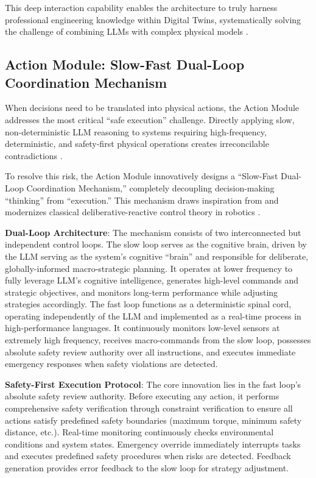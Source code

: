 This deep interaction capability enables the architecture to truly harness professional engineering knowledge within Digital Twins, systematically solving the challenge of combining LLMs with complex physical models \cite{lu2022unified}.

\subsection{Action Module: Slow-Fast Dual-Loop Coordination Mechanism}

When decisions need to be translated into physical actions, the Action Module addresses the most critical ``safe execution'' challenge. Directly applying slow, non-deterministic LLM reasoning to systems requiring high-frequency, deterministic, and safety-first physical operations creates irreconcilable contradictions \cite{amodei2016concrete}.

To resolve this risk, the Action Module innovatively designs a ``Slow-Fast Dual-Loop Coordination Mechanism,'' completely decoupling decision-making ``thinking'' from ``execution.'' This mechanism draws inspiration from and modernizes classical deliberative-reactive control theory in robotics \cite{gat1998three}.

\textbf{Dual-Loop Architecture}: The mechanism consists of two interconnected but independent control loops. The slow loop serves as the cognitive brain, driven by the LLM serving as the system's cognitive ``brain'' and responsible for deliberate, globally-informed macro-strategic planning. It operates at lower frequency to fully leverage LLM's cognitive intelligence, generates high-level commands and strategic objectives, and monitors long-term performance while adjusting strategies accordingly. The fast loop functions as a deterministic spinal cord, operating independently of the LLM and implemented as a real-time process in high-performance languages. It continuously monitors low-level sensors at extremely high frequency, receives macro-commands from the slow loop, possesses absolute safety review authority over all instructions, and executes immediate emergency responses when safety violations are detected.

\textbf{Safety-First Execution Protocol}: The core innovation lies in the fast loop's absolute safety review authority. Before executing any action, it performs comprehensive safety verification through constraint verification to ensure all actions satisfy predefined safety boundaries (maximum torque, minimum safety distance, etc.). Real-time monitoring continuously checks environmental conditions and system states. Emergency override immediately interrupts tasks and executes predefined safety procedures when risks are detected. Feedback generation provides error feedback to the slow loop for strategy adjustment.

